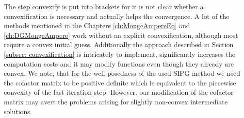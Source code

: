 The step convexify is put into brackets for it is not clear whether a convexification is necessary and actually helps the convergence. A lot of the methods mentioned in the Chapters \ref{ch:MongeAmpereEq} and \ref{ch:DGMongeAmpere} work without an explicit convexification, although most require a convex initial guess. 
Additionally the approach described in Section \ref{subsec: convexification} is intricately to implement, significantly increases the computation costs and it may modify functions even though they already are convex. We note, that for the well-posedness of the used SIPG method we need the cofactor matrix to be positive definite which is equivalent to the piecewise convexity of the last iteration step. However, our modification of the cofactor matrix  may avert the problems arising for slightly non-convex intermediate solutions.
